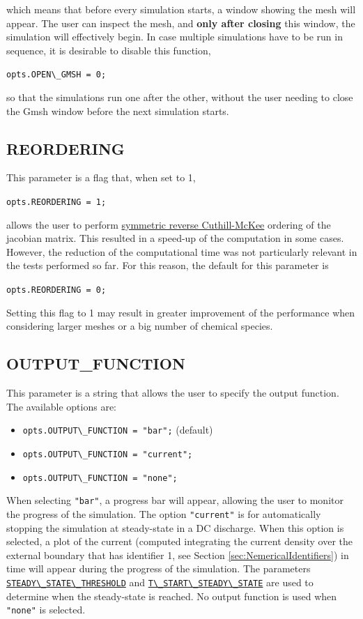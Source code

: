 \documentclass[12pt,a4paper]{article}
\newcommand{\matlabs}[1]{{\lstinline[style=MatlabStyle]!#1!}}
\newcommand{\seclink}[2]{%
	\begingroup
	\hypersetup{linkcolor=orange}%
	\hyperref[sec:#1]{\matlabs{#2}}%
	\endgroup
}
\begin{document}
	\noindent which means that before every simulation starts, a window showing the mesh will appear. The user can inspect the mesh, and \textbf{only after closing} this window, the simulation will effectively begin.
	In case multiple simulations have to be run in sequence, it is desirable to disable this function, 
	
	\matlabs{opts.OPEN\_GMSH = 0;}
	
	\noindent so that the simulations run one after the other, without the user needing to close the Gmsh window before the next simulation starts.
	
	\subsection{REORDERING}
	\label{sec:reordering}
	This parameter is a flag that, when set to 1, 
	
	\matlabs{opts.REORDERING = 1;}
	
	\noindent allows the user to perform \href{https://it.mathworks.com/help/matlab/ref/symrcm.html}{symmetric reverse Cuthill-McKee} ordering of the jacobian matrix.
	This resulted in a speed-up of the computation in some cases. However, the reduction of the computational time was not particularly relevant in the tests performed so far. For this reason, the default for this parameter is
	
	\matlabs{opts.REORDERING = 0;}
	
	\noindent Setting this flag to 1 may result in greater improvement of the performance when considering larger meshes or a big number of chemical species.
	
	\subsection{OUTPUT\_FUNCTION}
	\label{sec:outputfunction}
	This parameter is a string that allows the user to specify the output function. The available options are:
	\begin{itemize}
		\item \matlabs{opts.OUTPUT\_FUNCTION = "bar";} (default)
		\item \matlabs{opts.OUTPUT\_FUNCTION = "current";}
		\item \matlabs{opts.OUTPUT\_FUNCTION = "none";}
	\end{itemize}
	When selecting \matlabs{"bar"}, a progress bar will appear, allowing the user to monitor the progress of the simulation.
	The option \matlabs{"current"} is for automatically stopping the simulation at steady-state in a DC discharge. When this option is selected, a plot of the current (computed integrating the current density over the external boundary that has identifier 1, see Section \ref{sec:NemericalIdentifiers}) in time will appear during the progress of the simulation. The parameters \seclink{steadystatethreshold}{STEADY\_STATE\_THRESHOLD} and \seclink{tstartsteadystate}{T\_START\_STEADY\_STATE} are used to determine when the steady-state is reached. 
	No output function is used when \matlabs{"none"} is selected.
	
\end{document}
